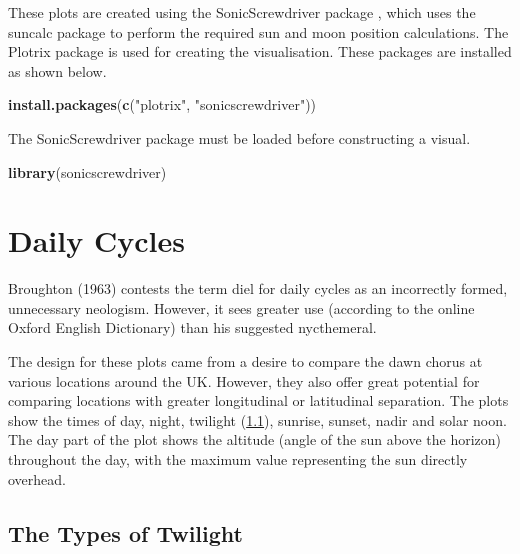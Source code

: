 \documentclass[
]{book}
\newenvironment{Shaded}{\begin{snugshade}}{\end{snugshade}}
\newcommand{\FunctionTok}[1]{\textcolor[rgb]{0.13,0.29,0.53}{\textbf{#1}}}
\newcommand{\NormalTok}[1]{#1}
\newcommand{\StringTok}[1]{\textcolor[rgb]{0.31,0.60,0.02}{#1}}
\begin{document}
These plots are created using the SonicScrewdriver package \citep{sonicscrewdriver}, which uses the suncalc package \citep{suncalc} to perform the required sun and moon position calculations. The Plotrix package \citep{plotrix} is used for creating the visualisation. These packages are installed as shown below.

\begin{Shaded}
\begin{Highlighting}[]
\FunctionTok{install.packages}\NormalTok{(}\FunctionTok{c}\NormalTok{(}\StringTok{"plotrix"}\NormalTok{, }\StringTok{"sonicscrewdriver"}\NormalTok{))}
\end{Highlighting}
\end{Shaded}

The SonicScrewdriver package must be loaded before constructing a visual.

\begin{Shaded}
\begin{Highlighting}[]
\FunctionTok{library}\NormalTok{(sonicscrewdriver)}
\end{Highlighting}
\end{Shaded}

\hypertarget{daily-cycles}{%
\section{Daily Cycles}\label{daily-cycles}}

Broughton (1963) contests the term diel for daily cycles as an incorrectly formed, unnecessary neologism. However, it sees greater use (according to the online Oxford English Dictionary) than his suggested nycthemeral.

The design for these plots came from a desire to compare the dawn chorus at various locations around the UK. However, they also offer great potential for comparing locations with greater longitudinal or latitudinal separation. The plots show the times of day, night, twilight (\ref{twilight-types}), sunrise, sunset, nadir and solar noon. The day part of the plot shows the altitude (angle of the sun above the horizon) throughout the day, with the maximum value representing the sun directly overhead.

\hypertarget{twilight-types}{%
\subsection{The Types of Twilight}\label{twilight-types}}
\end{document}
